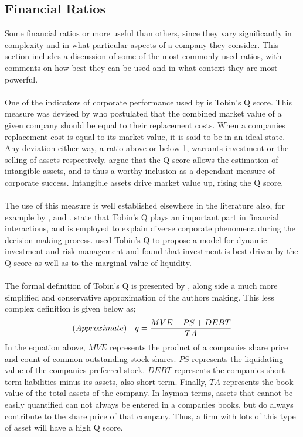 \subsection{Financial Ratios}\label{FinancialRatios}
{Some financial ratios or more useful than others, since they vary significantly in complexity and in what particular aspects of a company they consider. This section includes a discussion of some of the most commonly used ratios, with comments on how best they can be used and in what context they are most powerful. \\\\
One of the indicators of corporate performance used by \cite{moldovan2015learning} is Tobin's Q score. This measure was devised by \cite{tobin1969general} who postulated that the combined market value of a given company should be equal to their replacement costs. When a companies replacement cost is equal to its market value, it is said to be in an ideal state. Any deviation either way, a ratio above or below 1, warrants investment or the selling of assets respectively. \cite{moldovan2015learning} argue that the Q score allows the estimation of intangible assets, and is thus a worthy inclusion as a dependant measure of corporate success. Intangible assets drive market value up, rising the Q score.  \\\\
The use of this measure is well established elsewhere in the literature also, for example by \cite{chung1994simple}, 
\cite{bhagat2008corporate} and \cite{bolton2011unified}. \cite{chung1994simple} state that Tobin's Q plays an important part in financial interactions, and is employed to explain diverse corporate phenomena during the decision making process. \cite{bolton2011unified} used Tobin's Q to propose a model for dynamic investment and risk management and found that investment is best driven by the Q score as well as to the marginal value of liquidity. \\\\
The formal definition of Tobin's Q is presented by \cite{chung1994simple}, along side a much more simplified and conservative approximation of the authors making. This less complex definition is given below as; \\
\begin {equation}\label{TobinQ}
(Approximate) \quad q  = \small {\frac{MVE + PS + DEBT}{TA}}
\end{equation}
In the equation above, $MVE$ represents the product of a companies share price and count of common outstanding stock shares. $PS$ represents the liquidating value of the companies preferred stock. $DEBT$ represents the companies short-term liabilities minus its assets, also short-term. Finally, $TA$ represents the book value of the total assets of the company. In layman terms, assets that cannot be easily quantified can not always be entered in a companies books, but do always contribute to the share price of that company. Thus, a firm with lots of this type of asset will have a high Q score.\\\\ 
}
